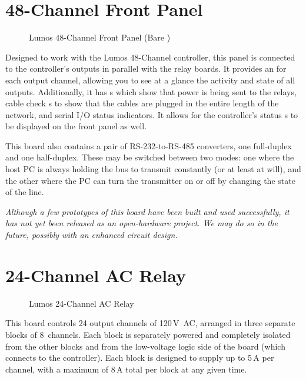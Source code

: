 \documentclass[letterpaper,twoside,onecolumn,openright,final]{memoir}
\begin{document}
\section{48-Channel Front Panel}
\begin{figure}
  \begin{center}
  \end{center}
  \caption{Lumos 48-Channel Front Panel (Bare )}
\end{figure}
Designed to work with the Lumos 48-Channel controller, this panel is connected to the controller's outputs
in parallel with the relay boards.  It provides an  for each output channel, allowing you
to see at a glance the activity and state of all outputs.  Additionally, it has s which show
that power is being sent to the relays, cable check s to show that the cables are plugged in
the entire length of the network, and serial I/O status indicators. It allows for the controller's status
s to be displayed on the front panel as well.

This board also contains a pair of RS-232-to-RS-485 converters, one full-duplex and one half-duplex.
These may be switched between two modes: one where the host PC is always holding the bus to transmit
constantly (or at least at will), and the other where the PC can turn the transmitter on or off by
changing the state of the  line.

\emph{Although a few prototypes of this board have been built and used successfully, it has not yet been
released as an open-hardware project.  We may do so in the future, possibly with an enhanced circuit
design.}

\section{24-Channel AC Relay}
\begin{figure}
  \begin{center}
  \end{center}
  \caption{Lumos 24-Channel AC Relay}
\end{figure}
This board controls 24 output channels of 120\,V~AC, arranged in three separate blocks of 8~channels.
Each block is separately powered and completely isolated from the other blocks and from the low-voltage
logic side of the board (which connects to the controller).  Each block is designed to supply up to
5\,A per channel, with a maximum of 8\,A total per block at any given time.
\end{document}
